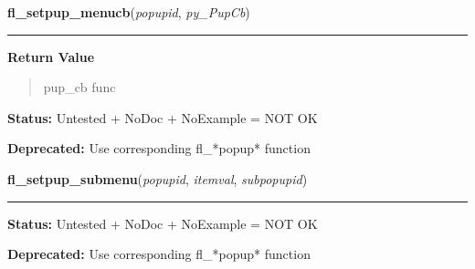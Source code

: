     \label{xformslib:library:fl_setpup_menucb}

    \vspace{0.5ex}

\hspace{.8\funcindent}\begin{boxedminipage}{\funcwidth}

    \raggedright \textbf{fl\_setpup\_menucb}(\textit{popupid}, \textit{py\_PupCb})

    \vspace{-1.5ex}

    \rule{\textwidth}{0.5\fboxrule}
\setlength{\parskip}{2ex}
\setlength{\parskip}{1ex}
      \textbf{Return Value}
    \vspace{-1ex}

      \begin{quote}
      pup\_cb func

      \end{quote}

\textbf{Status:} Untested + NoDoc + NoExample = NOT OK



\textbf{Deprecated:} Use corresponding fl\_*popup* function



    \end{boxedminipage}

    \label{xformslib:library:fl_setpup_submenu}

    \vspace{0.5ex}

\hspace{.8\funcindent}\begin{boxedminipage}{\funcwidth}

    \raggedright \textbf{fl\_setpup\_submenu}(\textit{popupid}, \textit{itemval}, \textit{subpopupid})

    \vspace{-1.5ex}

    \rule{\textwidth}{0.5\fboxrule}
\setlength{\parskip}{2ex}
\setlength{\parskip}{1ex}
\textbf{Status:} Untested + NoDoc + NoExample = NOT OK



\textbf{Deprecated:} Use corresponding fl\_*popup* function



    \end{boxedminipage}

